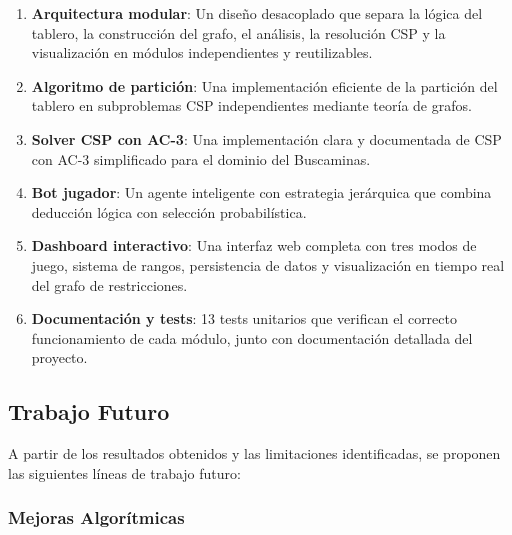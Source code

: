 \documentclass[12pt,a4paper]{article}
\begin{document}
\begin{enumerate}[itemsep=2pt]
    \item \textbf{Arquitectura modular}: Un diseño desacoplado que separa la lógica del tablero, la construcción del grafo, el análisis, la resolución CSP y la visualización en módulos independientes y reutilizables.

    \item \textbf{Algoritmo de partición}: Una implementación eficiente de la partición del tablero en subproblemas CSP independientes mediante teoría de grafos.

    \item \textbf{Solver CSP con AC-3}: Una implementación clara y documentada de CSP con AC-3 simplificado para el dominio del Buscaminas.

    \item \textbf{Bot jugador}: Un agente inteligente con estrategia jerárquica que combina deducción lógica con selección probabilística.

    \item \textbf{Dashboard interactivo}: Una interfaz web completa con tres modos de juego, sistema de rangos, persistencia de datos y visualización en tiempo real del grafo de restricciones.

    \item \textbf{Documentación y tests}: 13 tests unitarios que verifican el correcto funcionamiento de cada módulo, junto con documentación detallada del proyecto.
\end{enumerate}

\subsection{Trabajo Futuro}

A partir de los resultados obtenidos y las limitaciones identificadas, se proponen las siguientes líneas de trabajo futuro:

\subsubsection{Mejoras Algorítmicas}
\end{document}

